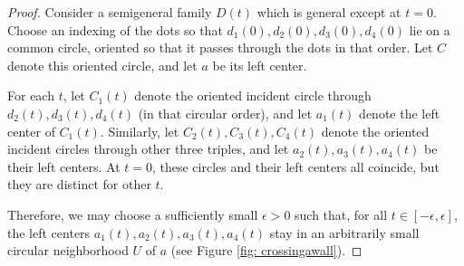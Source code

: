 \documentclass[11pt,oneside]{amsart}
\theoremstyle{definition}
\theoremstyle{remark}
\numberwithin{equation}{section}
\begin{document}
\begin{proof}
Consider a semigeneral family $D(t)$ which is general except at $t=0$. Choose an indexing of the dots so that $d_1(0),d_2(0),d_3(0),d_4(0)$ lie on a common circle, oriented so that it passes through the dots in that order. Let $C$ denote this oriented circle, and let $a$ be its left center.





For each $t$, let $C_1(t)$ denote the oriented incident circle through $d_2(t),d_3(t),d_4(t)$ (in that circular order), and let $a_1(t)$ denote the left center of $C_1(t)$. Similarly, let $C_2(t), C_3(t),C_4(t)$ denote the oriented incident circles through other three triples, and let $a_2(t),a_3(t),a_4(t)$ be their left centers. At $t=0$, these circles and their left centers all coincide, but they are distinct for other $t$. 

Therefore, we may choose a sufficiently small $\epsilon>0$ such that, for all $t\in [-\epsilon,\epsilon]$, the left centers $a_1(t),a_2(t),a_3(t),a_4(t)$ stay in an arbitrarily small circular neighborhood $U$ of $a$ (see Figure \ref{fig: crossingawall}).


\end{proof}
\end{document}
